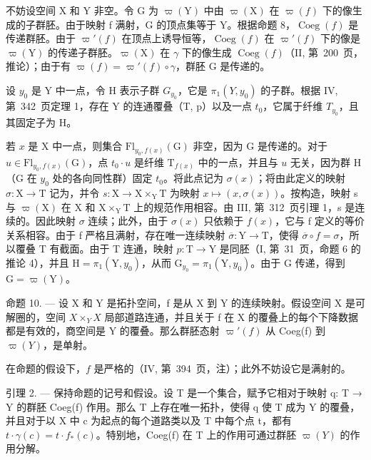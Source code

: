 不妨设空间 X 和 Y 非空。令 G 为 \(\varpi(\mathrm{Y})\) 中由 \(\varpi(\mathrm{X})\) 在 \(\varpi(f)\) 下的像生成的子群胚。由于映射 f 满射，G 的顶点集等于 Y。根据命题 8，\(\operatorname{Coeg}(f)\) 是传递群胚。由于 \(\varpi'(f)\) 在顶点上诱导恒等，\(\operatorname{Coeg}(f)\) 在 \(\varpi'(f)\) 下的像是 \(\varpi(\mathrm{Y})\) 的传递子群胚。\(\varpi(\mathrm{X})\) 在 \(\gamma\) 下的像生成 \(\operatorname{Coeg}(f)\)（II, 第~200~页，推论）；由于有 \(\varpi(f) = \varpi'(f) \circ \gamma\)，群胚 G 是传递的。

设 \(y_{0}\) 是 Y 中一点，令 H 表示子群 \(G_{y_{0}}\)，它是 \(\pi_{1}(Y, y_{0})\) 的子群。根据 IV, 第~342~页定理 1，存在 Y 的连通覆叠（T, p）以及一点 \(t_{0}\)，它属于纤维 \(T_{y_{0}}\)，且其固定子为 H。

若 \(x\) 是 X 中一点，则集合 \(\mathrm{Fl}_{y_0,f(x)}(\mathrm{G})\) 非空，因为 G 是传递的。对于 \(u\in \mathrm{Fl}_{y_0,f(x)}(\mathrm{G})\)，点 \(t_0\cdot u\) 是纤维 \(\mathrm{T}_{f(x)}\) 中的一点，并且与 \(u\) 无关，因为群 H（G 在 \(y_0\) 处的各向同性群）固定 \(t_0\)。将此点记为 \(\sigma (x)\)；将由此定义的映射 \(\sigma \colon \mathrm{X}\to \mathrm{T}\) 记为，并令 \(s\colon \mathrm{X}\to \mathrm{X}\times_{\mathrm{Y}}\mathrm{T}\) 为映射 \(x\mapsto (x,\sigma (x))\)。按构造，映射 s 与 \(\varpi (\mathrm{X})\) 在 X 和 \(\mathrm{X}\times_{\mathrm{Y}}\mathrm{T}\) 上的规范作用相容。由 III, 第~312~页引理 1，s 是连续的。因此映射 \(\sigma\) 连续；此外，由于 \(\sigma (x)\) 只依赖于 \(f(x)\)，它与 f 定义的等价关系相容。由于 f 严格且满射，存在唯一连续映射 \(\overline{\sigma}\colon \mathrm{Y}\to \mathrm{T}\)，使得 \(\overline{\sigma}\circ f = \sigma\)，所以覆叠 T 有截面。由于 T 连通，映射 \(p\colon \mathrm{T}\to \mathrm{Y}\) 是同胚（I, 第~31~页，命题 6 的推论 4），并且 \(\mathrm{H} = \pi_1(\mathrm{Y},y_0)\)，从而 \(\mathrm{G}_{y_0} = \pi_1(\mathrm{Y},y_0)\)。由于 G 传递，得到 \(\mathrm{G} = \varpi (\mathrm{Y})\)。

命题 10. --- 设 X 和 Y 是拓扑空间，f 是从 X 到 Y 的连续映射。假设空间 X 是可解圈的，空间 \(X\times_{Y}X\) 局部道路连通，并且关于 f 在 X 的覆叠上的每个下降数据都是有效的，商空间是 Y 的覆叠。那么群胚态射 \(\varpi'(f)\) 从 Coeg(f) 到 \(\varpi(Y)\)，是单射。

在命题的假设下，\(f\) 是严格的（IV, 第~394~页，注）；此外不妨设它是满射的。

引理 2. --- 保持命题的记号和假设。设 T 是一个集合，赋予它相对于映射 q: T → Y 的群胚 Coeg(f) 作用。那么 T 上存在唯一拓扑，使得 q 使 T 成为 Y 的覆叠，并且对于以 X 中 c 为起点的每个道路类以及 T 中每个点 t，都有 \(t \cdot \gamma(c) = t \cdot f_{*}(c)\)。特别地，Coeg(f) 在 T 上的作用可通过群胚 \(\varpi(Y)\) 的作用分解。


